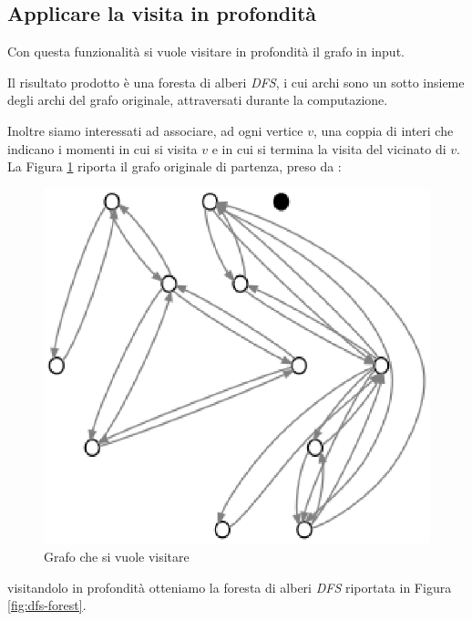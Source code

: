 \subsection{Applicare la visita in profondit\`a}
Con questa funzionalit\`a si vuole visitare in profondit\`a il grafo
in input.

Il risultato prodotto \`e una foresta di alberi \emph{DFS}, i cui
archi sono un sotto insieme degli archi del grafo originale,
attraversati durante la computazione.

Inoltre siamo interessati ad associare, ad ogni vertice $v$, una
coppia di interi che indicano i momenti in cui si visita $v$ e in cui
si termina la visita del vicinato di $v$. La Figura
\ref{fig:before-applying-dfs-search} riporta il grafo originale di
partenza, preso da \cite{Algorithms}:
\begin{figure}
  \centering
  \includegraphics{images/OnePipingLevelUnitTest_Printer_DFS_PrinterPipe_Papadimitriou-phase-PrinterPipeFilter-level-0.eps}
  \caption{Grafo che si vuole visitare}
  \label{fig:before-applying-dfs-search}
\end{figure}
visitandolo in profondit\`a otteniamo la foresta di alberi \emph{DFS}
riportata in Figura \ref{fig:dfs-forest}.
